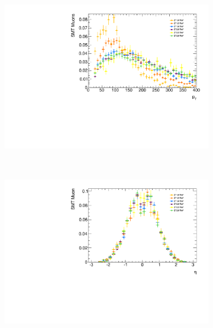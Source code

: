 \begin{figure}[t]
\begin{subfigure}{0.49\linewidth}
\includegraphics[width=\textwidth]{PartBoosted/Plots/h_smt_pt.pdf}
\end{subfigure}
~
\begin{subfigure}{0.49\linewidth}
\includegraphics[width=\textwidth]{PartBoosted/Plots/h_smt_eta.pdf}
\end{subfigure}


\end{figure}
